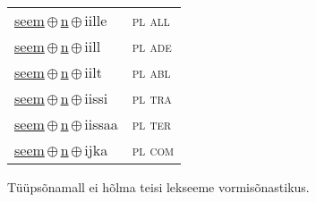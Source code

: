 \begin{minipage}{\textwidth}
\begin{sideways}
\begin{tabular}{l l}
\underline{seem}\,$\oplus$\,\underline{n}\,$\oplus$\,iille & \textsc{ pl all } \\
\underline{seem}\,$\oplus$\,\underline{n}\,$\oplus$\,iill & \textsc{ pl ade } \\
\underline{seem}\,$\oplus$\,\underline{n}\,$\oplus$\,iilt & \textsc{ pl abl } \\
\underline{seem}\,$\oplus$\,\underline{n}\,$\oplus$\,iissi & \textsc{ pl tra } \\
\underline{seem}\,$\oplus$\,\underline{n}\,$\oplus$\,iissaa & \textsc{ pl ter } \\
\underline{seem}\,$\oplus$\,\underline{n}\,$\oplus$\,ijka & \textsc{ pl com } \\
\end{tabular}
\end{sideways}
\label{tab:tüüpsõnamall-seemen}

\end{minipage}

 
\vspace{1em}
\noindent Tüüpsõnamall  ei hõlma teisi lekseeme vormi\-sõnastikus.
